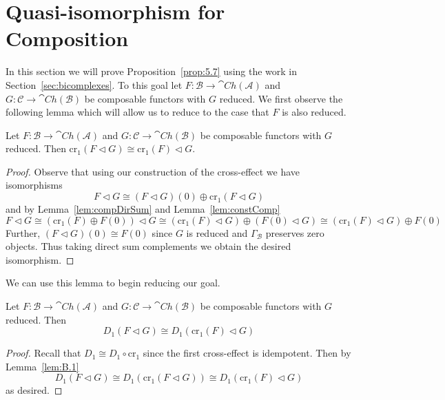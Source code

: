 \section{Quasi-isomorphism for Composition}\label{sec:Lotswork}

In this section we will prove Proposition~\ref{prop:5.7} using the work in Section~\ref{sec:bicomplexes}. To this goal let $F:\mathcal{B}\to \cat{Ch}(\mathcal{A})$ and $G:\mathcal{C}\to \cat{Ch}(\mathcal{B})$ be composable functors with $G$ reduced. We first observe the following lemma which will allow us to reduce to the case that $F$ is also reduced.

\begin{lem}[label=lem:B.1]
    Let $F:\mathcal{B}\to \cat{Ch}(\mathcal{A})$ and $G:\mathcal{C}\to \cat{Ch}(\mathcal{B})$ be composable functors with $G$ reduced. Then $\text{cr}_1(F\lhd G)\cong \text{cr}_1(F)\lhd G$.
\end{lem}
\begin{proof}
    Observe that using our construction of the cross-effect we have isomorphisms
    \begin{equation*}
        F\lhd G \cong (F\lhd G)(0) \oplus \text{cr}_1(F\lhd G)
    \end{equation*}
    and by Lemma~\ref{lem:compDirSum} and Lemma~\ref{lem:constComp}
    \begin{equation*}
        F\lhd G\cong (\text{cr}_1(F)\oplus F(0))\lhd G \cong (\text{cr}_1(F)\lhd G)\oplus (F(0)\lhd G) \cong (\text{cr}_1(F)\lhd G)\oplus F(0)
    \end{equation*}
    Further, $(F\lhd G)(0) \cong F(0)$ since $G$ is reduced and $\Gamma_\mathcal{B}$ preserves zero objects. Thus taking direct sum complements we obtain the desired isomorphism.
\end{proof}

We can use this lemma to begin reducing our goal.

\begin{cor}[label=cor:B.2]
    Let $F:\mathcal{B}\to \cat{Ch}(\mathcal{A})$ and $G:\mathcal{C}\to \cat{Ch}(\mathcal{B})$ be composable functors with $G$ reduced. Then
    \begin{equation*}
        D_1(F\lhd G)\cong D_1(\text{cr}_1(F)\lhd G)
    \end{equation*}
\end{cor}
\begin{proof}
    Recall that $D_1\cong D_1\circ \text{cr}_1$ since the first cross-effect is idempotent. Then by Lemma~\ref{lem:B.1}
    \begin{equation*}
        D_1(F\lhd G) \cong D_1(\text{cr}_1(F\lhd G)) \cong D_1(\text{cr}_1(F)\lhd G)
    \end{equation*}
    as desired.
\end{proof}

